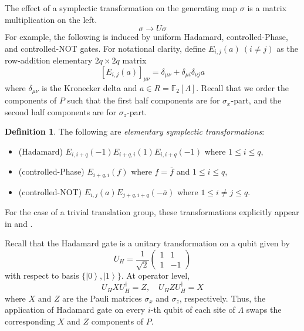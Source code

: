 \documentclass[letterpaper,12pt]{amsart}
\theoremstyle{definition} \newtheorem{defn}{Definition}
\theoremstyle{definition} \newtheorem{rem}{Remark}
\theoremstyle{definition} \newtheorem{example}{Example}
\newcommand{\ket}[1]{\left| {#1} \right\rangle}
\newcommand{\FF}{\mathbb{F}}
\begin{document}
The effect of a symplectic transformation on the generating map $\sigma$
 is a matrix multiplication on the left.
\[
 \sigma \to U \sigma
\]
For example, the following is induced
by uniform Hadamard, controlled-Phase, and controlled-NOT gates.
For notational clarity,
define $E_{i,j}(a)\ (i \neq j)$ as the row-addition elementary $2q \times 2q$ matrix
\[
 \left[ E_{i,j}(a) \right]_{\mu \nu} = \delta_{\mu \nu} + \delta_{\mu i} \delta_{\nu j} a
\]
where $\delta_{\mu \nu}$ is the Kronecker delta and $a \in R = \FF_2[\Lambda]$.
Recall that we order the components of $P$ such that the first half components are for $\sigma_x$-part, 
and the second half components are for $\sigma_z$-part.
\begin{defn}
The following are {\em elementary symplectic transformations}:
\begin{itemize}
 \item (Hadamard) $E_{i,i+q}(-1) E_{i+q,i}(1) E_{i,i+q}(-1)$ where $1 \le i \le q$,
 \item (controlled-Phase) $E_{i+q,i}(f)$ where $f = \bar f$ and $1 \le i \le q$,
 \item (controlled-NOT) $E_{i,j}(a) E_{j+q,i+q}(-\bar a)$ where $1 \le i \ne j \le q$.
\end{itemize}
\end{defn}
For the case of a trivial translation group,
these transformations explicitly appear in \cite{CalderbankRainsShorEtAl1997Quantum}
and \cite[Chapter~15]{KitaevShenVyalyi2002CQC}.

Recall that the Hadamard gate is a unitary transformation on a qubit given by
\[
U_H = \frac{1}{\sqrt 2}
 \begin{pmatrix}
  1 & 1 \\
  1 & -1
 \end{pmatrix}
\]
with respect to basis $\{ \ket 0 , \ket 1 \}$.
At operator level,
\[
 U_H X U_H^\dagger = Z, \quad U_H Z U_H^\dagger = X 
\]
where $X$ and $Z$ are the Pauli matrices $\sigma_x$ and $\sigma_z$, respectively.
Thus, the application of Hadamard gate on every $i$-th qubit of each site of $\Lambda$
swaps the corresponding $X$ and $Z$ components of $P$.
\end{document}
